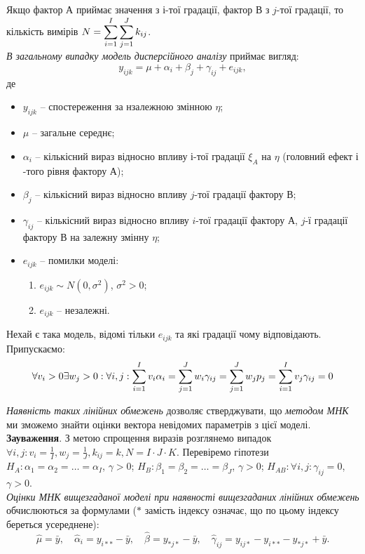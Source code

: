 Якщо фактор $А$ приймає значення з $і$-тої градації, фактор $В$ з $j$-тої градації, то кількість
вимірів $N = \displaystyle\sum\limits_{i=1}^I \displaystyle\sum\limits_{j=1}^J k_{ij}$. \\

\textit{В загальному випадку модель дисперсійного аналізу} приймає вигляд: \[ y_{ijk} = \mu + \alpha_i + \beta_j + \gamma_{ij} + e_{ijk}, \] де 
\begin{itemize}
	\item $y_{ijk}$ -- спостереження за нзалежною змінною $\eta$;
	\item $\mu$ -- загальне середнє;
	\item $\alpha_i$ -- кількісний вираз відносно впливу $і$-тої градації $\xi_A$ на $\eta$ (головний ефект $і$-того рівня фактору $А$); 
	\item $\beta_j$ -- кількісний вираз відносно впливу $j$-тої градації фактору $В$;
	\item $\gamma_{ij}$ -- кількісний вираз відносно впливу $i$-тої градації фактору $А$, $j$-ї градації фактору $В$ на залежну змінну $\eta$;
	\item $e_{ijk}$ -- помилки моделі:
	\begin{enumerate}
		\item $e_{ijk} \sim N(0, \sigma^2)$, $\sigma^2>0$;
		\item $e_{ijk}$ -- незалежні.
	\end{enumerate}
\end{itemize}

Нехай є така модель, відомі тільки $e_{ijk}$ та які градації чому відповідають. \\

Припускаємо: \[ \forall v_i>0 \exists w_j>0: \forall i,j: \displaystyle\sum\limits_{i=1}^I v_i\alpha_i=\displaystyle\sum\limits_{j=1}^J w_i\gamma_{ij} = \displaystyle\sum\limits_{j=1}^J w_jp_j = \displaystyle\sum\limits_{i=1}^I v_j\gamma_{ij}=0 \]

\textit{Наявність таких лінійних обмежень} дозволяє стверджувати, що \textit{методом МНК} ми зможемо знайти оцінки вектора невідомих параметрів з цієї моделі. \\

\textbf{Зауваження}. З метою спрощення виразів розглянемо випадок $\forall i,j: v_i = \frac{1}{I}, w_j = \frac{1}{J}, k_{ij}=k, N = I \cdot J \cdot K$. Перевіремо гіпотези $H_A: \alpha_1 = \alpha_2 = \ldots = \alpha_I$, $\gamma > 0$; $H_B: \beta_1 = \beta_2 = \ldots = \beta_J$, $\gamma > 0$; $H_{AB}: \forall i,j: \gamma_{ij} = 0$, $\gamma > 0$. \\

\textit{Оцінки МНК вищезгаданої моделі при наявності вищезгаданих лінійних обмежень} обчислюються за формулами ($*$ замість індексу означає, що по цьому індексу береться усереднене): \[ \widehat{\mu} = \bar{y}, \quad \widehat{\alpha}_i = y_{i**} - \bar{y}, \quad \widehat{\beta} = y_{*j*} - \bar{y}, \quad \widehat{\gamma}_{ij} =y_{ij*} - y_{i**} - y_{*j*} + \bar{y}.\]

